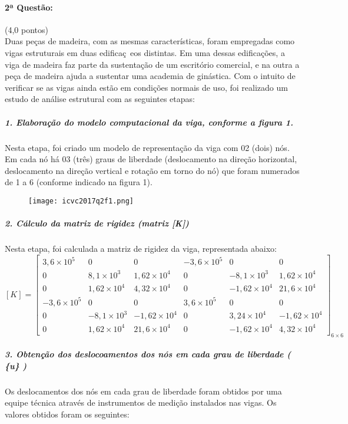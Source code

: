 \documentclass[12pt,a4paper]{article}
\begin{document}
\paragraph{2ª Questão:} (4,0 pontos)\\
Duas peças de madeira, com as mesmas características, foram empregadas como vigas estruturais em duas edificaç~eos distintas. Em uma dessas edificações, a viga de madeira faz parte da sustentação de um escritório comercial, e na outra a peça de madeira ajuda a sustentar uma academia de ginástica.
Com o intuito de verificar se as vigas ainda estão em condições normais de uso, foi realizado um estudo de análise estrutural com as seguintes etapas:
\subparagraph{1. Elaboração do modelo computacional da viga, conforme a figura 1.}

Nesta etapa, foi criado um modelo de representação da viga com 02 (dois) nós. Em cada nó há 03 (três) graus de liberdade (deslocamento na direção horizontal, deslocamento na direção vertical e rotação em torno do nó) que foram numerados de 1 a 6 (conforme indicado na figura 1).

\begin{figure}[ht]
\centering
\texttt{[image: icvc2017q2f1.png]}
\end{figure}

\subparagraph{2. Cálculo da matriz de rigidez (matriz [K])}

Nesta etapa, foi calculada a matriz de rigidez da viga, representada abaixo:$$[K] = \left[\begin{matrix}3,6 \times 10^5 & 0 & 0 & - 3,6 \times 10^5 & 0 & 0 \\
0 & 8,1 \times 10^3 & 1,62 \times 10^4 & 0 & -8,1 \times 10^3 & 1,62 \times 10^4 \\ 0 & 1,62 \times 10^4 & 4,32 \times 10^4 & 0 & -1,62 \times 10^4 & 21,6 \times 10^4 \\
-3,6 \times 10^5 & 0 & 0 & 3,6 \times 10^5 & 0 & 0 \\
0 & -8,1 \times 10^3 & -1,62\times 10^4 & 0 & 3,24\times 10^4 & -1,62\times 10^4 \\
0 & 1,62\times 10^4 & 21,6\times 10^4 & 0 & - 1,62 \times 10^4 & 4,32 \times 10^4
 \end{matrix}\right]_{6 \times 6}$$
 
 
\subparagraph{3. Obtenção dos deslocoamentos dos nós em cada grau de liberdade ( \{u\} )}

Os deslocamentos dos nós em cada grau de liberdade foram obtidos por uma equipe técnica através de instrumentos de medição instalados nas vigas. Os valores obtidos foram os seguintes:
\end{document}
